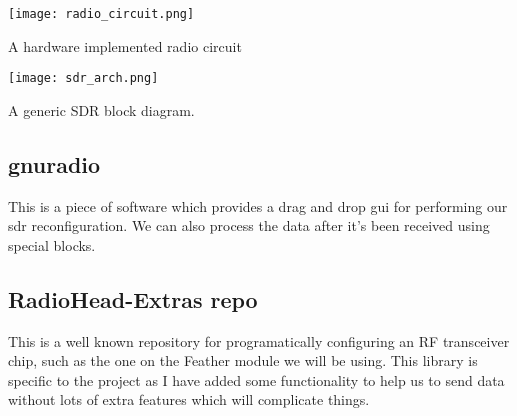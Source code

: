 \centrefigurestart
\texttt{[image: radio\_circuit.png]}
\caption{A hardware implemented radio circuit}
\label{radio_circuit}
\centrefigureend

\centrefigurestart
\texttt{[image: sdr\_arch.png]}
\caption{A generic SDR block diagram.}
\label{sdr_arch}
\centrefigureend

\subsection{gnuradio}
This is a piece of software which provides a drag and drop \gls{gui} for performing our \gls{sdr} reconfiguration. We can also process the data after it's been received using special blocks.

\subsection{RadioHead-Extras repo}
This is a well known repository for programatically configuring an \gls{RF} transceiver chip, such as the one on the Feather module we will be using. This library is specific to the project as I have added some functionality to help us to send data without lots of extra features which will complicate things.
